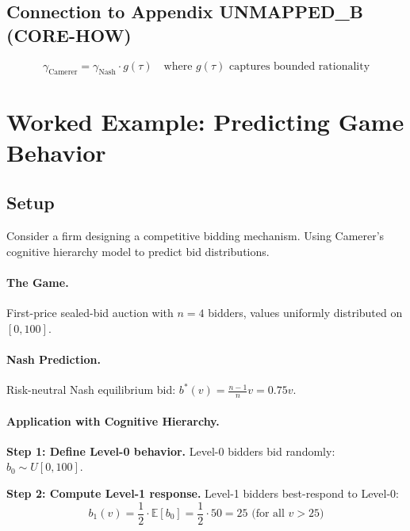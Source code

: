 \subsection{Connection to Appendix UNMAPPED_B (CORE-HOW)}

\begin{equation}
\gamma_{\text{Camerer}} = \gamma_{\text{Nash}} \cdot g(\tau) \quad \text{where } g(\tau) \text{ captures bounded rationality}
\end{equation}


\section{Worked Example: Predicting Game Behavior}
\label{sec:ca-example}

\subsection{Setup}
Consider a firm designing a competitive bidding mechanism. Using Camerer's cognitive hierarchy model to predict bid distributions.

\paragraph{The Game.} First-price sealed-bid auction with $n = 4$ bidders, values uniformly distributed on $[0, 100]$.

\paragraph{Nash Prediction.} Risk-neutral Nash equilibrium bid: $b^*(v) = \frac{n-1}{n} v = 0.75v$.

\paragraph{Application with Cognitive Hierarchy.}

\textbf{Step 1: Define Level-0 behavior.}
Level-0 bidders bid randomly: $b_0 \sim U[0, 100]$.

\textbf{Step 2: Compute Level-1 response.}
Level-1 bidders best-respond to Level-0:
\begin{equation}
b_1(v) = \frac{1}{2} \cdot \mathbb{E}[b_0] = \frac{1}{2} \cdot 50 = 25 \text{ (for all } v > 25\text{)}
\end{equation}

